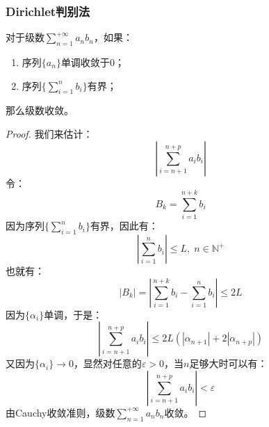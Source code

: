 \subsubsection{Dirichlet判别法}
\begin{theorem}
	对于级数$\sum\limits_{n=1}^{+\infty}a_nb_n$，如果：
	\begin{enumerate}
		\item 序列$\{a_n\}$单调收敛于$0$；
		\item 序列$\{\sum\limits_{i=1}^nb_i\}$有界；
	\end{enumerate}
	那么级数收敛。
\end{theorem}
\begin{proof}
	我们来估计：
	\begin{equation*}
		\left|\sum_{i=n+1}^{n+p}a_ib_i\right|
	\end{equation*}
	令：
	\begin{equation*}
		B_k=\sum_{i=1}^{n+k}b_i
	\end{equation*}
	因为序列$\{\sum\limits_{i=1}^nb_i\}$有界，因此有：
	\begin{equation*}
		\left|\sum\limits_{i=1}^nb_i\right|\leqslant L,\;n\in\mathbb{N}^+
	\end{equation*}
	也就有：
	\begin{equation*}
		|B_k|=\left|\sum_{i=1}^{n+k}b_i-\sum_{i=1}^nb_i\right|\leqslant 2L
	\end{equation*}
	因为$\{\alpha_i\}$单调，于是：
	\begin{equation*}
		\left|\sum_{i=n+1}^{n+p}a_ib_i\right|\leqslant 2L(|\alpha_{n+1}|+2|\alpha_{n+p}|)
	\end{equation*}
	又因为$\{\alpha_i\}\rightarrow0$，显然对任意的$\varepsilon>0$，当$n$足够大时可以有：
	\begin{equation*}
		\left|\sum_{i=n+1}^{n+p}a_ib_i\right|<\varepsilon
	\end{equation*}
	由Cauchy收敛准则，级数$\sum\limits_{n=1}^{+\infty}a_nb_n$收敛。
\end{proof}

